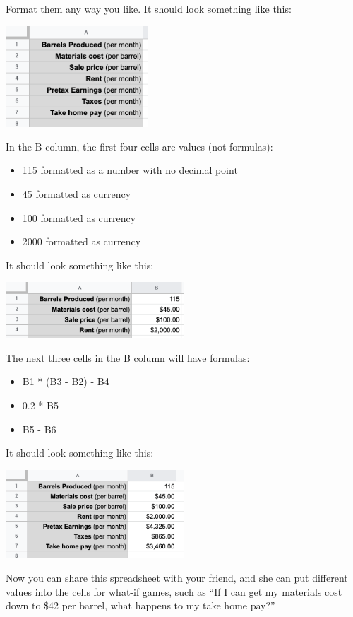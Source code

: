 Format them any way you like. It should look something like this:

\includegraphics[width=0.4\textwidth]{BarrelLabels.png}

In the B column, the first four cells are values (not formulas):
\begin{itemize}
\item{115 formatted as a number with no decimal point}
\item{45 formatted as currency}
\item{100 formatted as currency}
\item{2000 formatted as currency}
\end{itemize}

It should look something like this:

\includegraphics[width=0.5\textwidth]{BarrelValues.png}

The next three cells in the B column will have formulas:
\begin{itemize}
\item{B1 * (B3 - B2) - B4}
\item{0.2 * B5}
\item{B5 - B6}
\end{itemize}

It should look something like this:

\includegraphics[width=0.5\textwidth]{BarrelFormulas.png}

Now you can share this spreadsheet with your friend, and she can put
different values into the cells for what-if games, such as ``If I can
get my materials cost down to \$42 per barrel, what happens to my take
home pay?''

